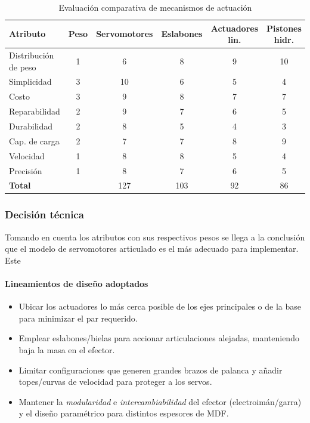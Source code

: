 \begin{table}[H]
\centering
\caption{Evaluación comparativa de mecanismos de actuación}
\begin{tabular}{lccccc}
\toprule
\textbf{Atributo} & \textbf{Peso} & \textbf{Servomotores} & \textbf{Eslabones} & \textbf{Actuadores lin.} & \textbf{Pistones hidr.} \\
\midrule
Distribución de peso & 1 & 6  & 8  & 9 & 10 \\
Simplicidad          & 3 & 10 & 6  & 5 & 4  \\
Costo                & 3 & 9  & 8  & 7 & 7  \\
Reparabilidad        & 2 & 9  & 7  & 6 & 5  \\
Durabilidad          & 2 & 8  & 5  & 4 & 3  \\
Cap. de carga        & 2 & 7  & 7  & 8 & 9  \\
Velocidad            & 1 & 8  & 8  & 5 & 4  \\
Precisión            & 1 & 8  & 7  & 6 & 5  \\
\midrule
\textbf{Total}       &    & 127 & 103 & 92 & 86 \\
\bottomrule
\end{tabular}
\end{table}


\subsubsection*{Decisión técnica}
Tomando en cuenta los atributos con sus respectivos pesos se llega a la conclusión que el modelo de servomotores articulado es el más adecuado para implementar. Este 
\paragraph{Lineamientos de diseño adoptados}
\begin{itemize}
  \item Ubicar los actuadores lo más cerca posible de los ejes principales o de la base para minimizar el par requerido.
  \item Emplear eslabones/bielas para accionar articulaciones alejadas, manteniendo baja la masa en el efector.
  \item Limitar configuraciones que generen grandes brazos de palanca y añadir topes/curvas de velocidad para proteger a los servos.
  \item Mantener la \emph{modularidad} e \emph{intercambiabilidad} del efector (electroimán/garra) y el diseño paramétrico para distintos espesores de MDF.\@
\end{itemize}

